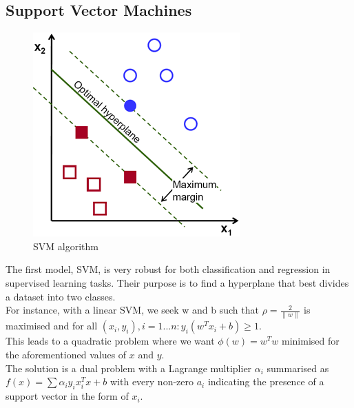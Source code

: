 \documentclass[a4paper,12pt,twoside,twocolumn]{article}
\begin{document}
\subsection{Support Vector Machines}
\label{sec:orge78b144}

\begin{center}
\begin{figure}[htbp]
\centering
\includegraphics[width=.9\linewidth]{./images/svm.png}
\caption{SVM algorithm}
\end{figure}
\end{center}

The first model, SVM, is very robust for both classification and regression in supervised learning tasks. Their purpose is to find a hyperplane that best divides a dataset into two classes.\\

For instance, with a linear SVM, we seek w and b such that \(\rho = \frac{2}{\|w\|}\) is maximised and for all \((x_i, y_i), i = 1...n: y_i(w^T x_i + b) \geq 1\).\\

This leads to a quadratic problem where we want \(\phi(w) = w^Tw\) minimised for the aforementioned values of \(x\) and \(y\).\\

The solution is a dual problem with a Lagrange multiplier \(\alpha_i\) summarised as \(f(x) = \sum \alpha_i y_i x_i^Tx + b\) with every non-zero \(a_i\) indicating the presence of a support vector in the form of \(x_i\).\\
\end{document}

